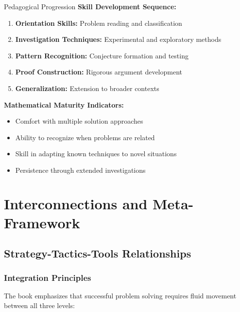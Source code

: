 \documentclass[12pt]{article}
\begin{document}
	\begin{examplebox}{Pedagogical Progression}
		\textbf{Skill Development Sequence:}
		\begin{enumerate}
			\item \textbf{Orientation Skills:} Problem reading and classification
			\item \textbf{Investigation Techniques:} Experimental and exploratory methods
			\item \textbf{Pattern Recognition:} Conjecture formation and testing
			\item \textbf{Proof Construction:} Rigorous argument development
			\item \textbf{Generalization:} Extension to broader contexts
		\end{enumerate}
		
		\textbf{Mathematical Maturity Indicators:}
		\begin{itemize}
			\item Comfort with multiple solution approaches
			\item Ability to recognize when problems are related
			\item Skill in adapting known techniques to novel situations
			\item Persistence through extended investigations
		\end{itemize}
	\end{examplebox}
	
	\section{Interconnections and Meta-Framework}
	
	\subsection{Strategy-Tactics-Tools Relationships}
	
	\subsubsection{Integration Principles}
	
	The book emphasizes that successful problem solving requires fluid movement between all three levels:
	
\end{document}
